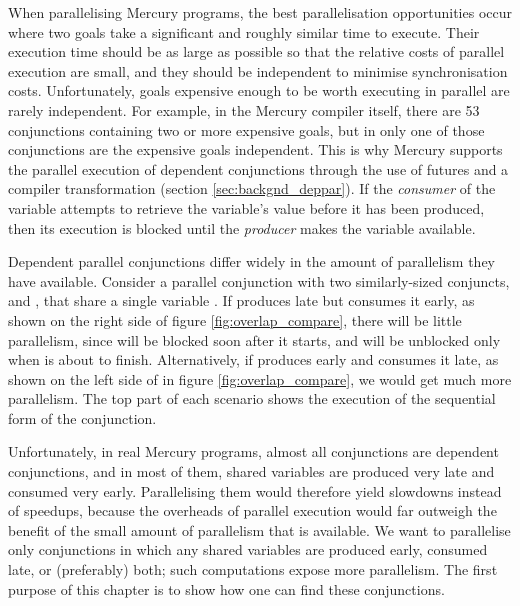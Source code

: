 When parallelising Mercury programs,
the best parallelisation opportunities occur
where two goals take a significant and roughly similar time to execute.
Their execution time should be as large as possible
so that the relative costs of parallel execution are small,
and they should be independent to minimise synchronisation costs.
Unfortunately, goals expensive enough to be worth executing in parallel
are rarely independent.
For example, in the Mercury compiler itself,
there are 53 conjunctions containing two or more expensive goals,
but in only one of those conjunctions are the expensive goals independent.
This is why Mercury supports the parallel execution of dependent conjunctions
through the use of futures and a compiler transformation
\citep{wang:2006:hons, wang:2011:dep-par} (section \ref{sec:backgnd_deppar}).
If the \emph{consumer} of the variable attempts to retrieve the variable's value
before it has been produced, then its execution is blocked
until the \emph{producer} makes the variable available.


Dependent parallel conjunctions differ widely
in the amount of parallelism they have available.
Consider a parallel conjunction with two similarly-sized conjuncts,
 and , that share a single variable .
If  produces  late but  consumes it early,
as shown on the right side of figure \ref{fig:overlap_compare},
there will be little parallelism,
since  will be blocked soon after it starts,
and will be unblocked only when  is about to finish.
Alternatively, if  produces  early
and  consumes it late,
as shown on the left side of in figure \ref{fig:overlap_compare},
we would get much more parallelism.
The top part of each scenario
shows the execution of the sequential form of the conjunction.

Unfortunately, in real Mercury programs,
almost all conjunctions are dependent conjunctions,
and in most of them,
shared variables are produced very late and consumed very early.
Parallelising them would therefore yield slowdowns instead of speedups,
because the overheads of parallel execution would far outweigh the
benefit of the small amount of parallelism that is available.
We want to parallelise only conjunctions
in which any shared variables are produced early, consumed late,
or (preferably) both;
such computations expose more parallelism.
The first purpose of this chapter is to show how one can find these conjunctions.

